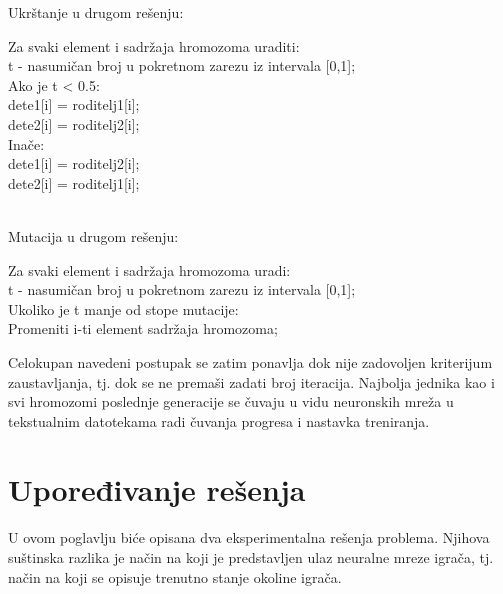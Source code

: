 \documentclass[a4paper]{article}
\begin{document}
\begin{tcolorbox}
\begin{center}
Ukrštanje u drugom rešenju: \\
\end{center}
Za svaki element i sadržaja hromozoma uraditi:\\
\hphantom{tcolorbox}t - nasumičan broj u pokretnom zarezu iz intervala [0,1];\\
\hphantom{tcolorbox}Ako je t < 0.5: \\
\hphantom{tcolorbox}\hphantom{tcolorbox}dete1[i] = roditelj1[i]; \\
\hphantom{tcolorbox}\hphantom{tcolorbox}dete2[i] = roditelj2[i]; \\
\hphantom{tcolorbox}Inače: \\
\hphantom{tcolorbox}\hphantom{tcolorbox}dete1[i] =  roditelj2[i]; \\
\hphantom{tcolorbox}\hphantom{tcolorbox}dete2[i] =  roditelj1[i]; \\~\\
\begin{center}
Mutacija u drugom rešenju:  \\
\end{center}
Za svaki element i sadržaja hromozoma uradi:\\
\hphantom{tcolorbox}t - nasumičan broj u pokretnom zarezu iz intervala [0,1];\\
\hphantom{tcolorbox}Ukoliko je t manje od stope mutacije: \\
\hphantom{tcolorbox}\hphantom{tcolorbox}Promeniti i-ti element sadržaja hromozoma;
\end{tcolorbox}

\par Celokupan navedeni postupak se zatim ponavlja dok nije zadovoljen kriterijum zaustavljanja, tj. dok se ne premaši zadati broj iteracija. Najbolja jednika kao i svi hromozomi poslednje generacije se čuvaju u vidu neuronskih mreža u tekstualnim datotekama radi čuvanja progresa i nastavka treniranja.

\section{Upoređivanje rešenja}
\label{sec:uporedjivanjeResenja}

\par U ovom poglavlju biće opisana dva eksperimentalna rešenja problema. Njihova suštinska razlika je način na koji je predstavljen ulaz neuralne mreze igrača, tj. način na koji se opisuje trenutno stanje okoline igrača.
\end{document}
